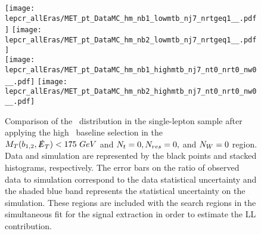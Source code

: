 \begin{figure}[!h]
	\begin{center}
  \texttt{[image: lepcr\_allEras/MET\_pt\_DataMC\_hm\_nb1\_lowmtb\_nj7\_nrtgeq1\_\_.pdf]}
  \texttt{[image: lepcr\_allEras/MET\_pt\_DataMC\_hm\_nb2\_lowmtb\_nj7\_nrtgeq1\_\_.pdf]} \\
  \texttt{[image: lepcr\_allEras/MET\_pt\_DataMC\_hm\_nb1\_highmtb\_nj7\_nt0\_nrt0\_nw0\_\_.pdf]}
  \texttt{[image: lepcr\_allEras/MET\_pt\_DataMC\_hm\_nb2\_highmtb\_nj7\_nt0\_nrt0\_nw0\_\_.pdf]} \\
	\end{center}
	\caption[Lost Lepton HM Control Region]{Comparison of the \met~distribution in the single-lepton sample after applying the high \dm~baseline selection in the $M_{T}(b_{1,2},\slashed{E}_{T})<175~GeV$ and $N_{t}=0, N_{res}=0,$ and $N_{W}=0$ region. Data and simulation are represented by the black points and stacked histograms, respectively. The error bars on the ratio of observed data to simulation correspond to the data statistical uncertainty and the shaded blue band represents the statistical uncertainty on the simulation. These regions are included with the search regions in the simultaneous fit for the signal extraction in order to estimate the LL contribution.
	 }
	\label{fig:llb-1lcr-datavsmc-hm-nt0-nrt0-nw0}
\end{figure}

